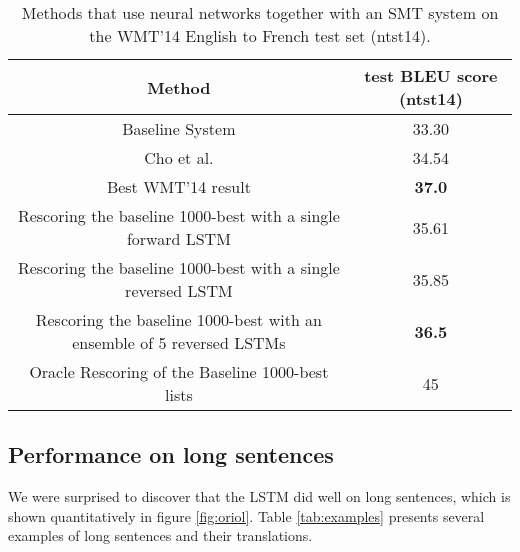 \documentclass{article} \usepackage{nips14submit_e}
\begin{document}
\begin{table}[]
\centering
\begin{small}
\begin{tabular}{|c|c|}
\hline
{\bf Method}  & {\bf test BLEU score (ntst14) } \\ \hline
Baseline System  \cite{wmt14_en_fr} & 33.30 \\ \hline
Cho et al. \cite{cho14}  & 34.54 \\ \hline 
Best WMT'14 result \cite{durrani-EtAl:2014:W14-33} &  {\bf 37.0} \\ \hline
\hline
Rescoring the baseline 1000-best with a single forward LSTM & 35.61 \\ \hline 
Rescoring the baseline 1000-best with a single reversed  LSTM & 35.85 \\ \hline  Rescoring the baseline 1000-best with an ensemble of 5 reversed LSTMs  &  {\bf 36.5} \\ \hline    \hline
Oracle Rescoring of the Baseline 1000-best lists    & 45 \\ \hline 
\end{tabular}
\end{small}
\caption{Methods that use neural networks together with an SMT system
  on the WMT'14 English to French test set (ntst14).}
\label{tab:blue_fr_rescore}
\end{table}



\subsection{Performance on long sentences}
\label{sec:long_sentences}

We were surprised to discover that the LSTM did well on long
sentences, which is shown quantitatively in figure \ref{fig:oriol}.
Table \ref{tab:examples} presents several examples of long sentences and
their translations. 
\end{document}
